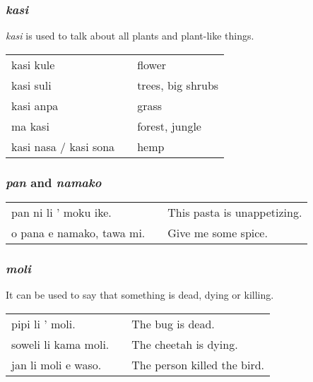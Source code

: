 \subsubsection*{\textit{kasi}}
%
\textit{kasi} is used to talk about all plants and plant-like things. 

\begin{supertabular}{p{5,5cm}|ll}
kasi kule && flower \\
kasi suli && trees, big shrubs \\
kasi anpa && grass \\
ma kasi && forest, jungle \\
kasi nasa / kasi sona && hemp  \\
\end{supertabular} 
%
\subsubsection*{\textit{pan} and \textit{namako}}
\begin{supertabular}{p{5,5cm}|ll}
pan ni li ' moku ike. && This pasta is unappetizing. \\
o pana e namako, tawa mi. &&   Give me some spice. \\
\end{supertabular} 
%
\subsubsection*{\textit{moli}}
%
It can be used to say that something is dead, dying or killing.

\begin{supertabular}{p{5,5cm}|ll}
pipi li ' moli. && The bug is dead. \\
soweli li kama moli. && The cheetah is dying. \\
jan li moli e waso. && The person killed the bird. \\
\end{supertabular} 
%
